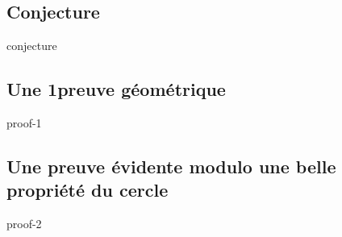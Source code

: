 \subsection{Conjecture}

{conjecture}




\subsection{Une 1\iere preuve géométrique}
\label{circle-proof-1}

{proof-1}




\subsection{Une preuve évidente modulo une belle propriété du cercle}
\label{circle-proof-2}

{proof-2}